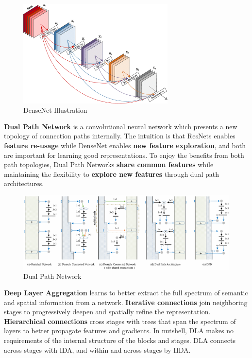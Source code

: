 \documentclass[a4paper, 11pt]{article} %
\begin{document}
\begin{figure}[H]
	\centering
	\includegraphics[width=0.7\textwidth]{./img/densenet.png}
	\caption{DenseNet Illustration}
\end{figure}

\textbf{Dual Path Network} is a convolutional neural network which presents a new topology
of connection paths internally. The intuition is that ResNets enables \textbf{feature re-usage}
while DenseNet enables \textbf{new feature exploration}, and both are important for learning
good representations. To enjoy the benefits from both path topologies, Dual Path Networks
\textbf{share common features} while maintaining the flexibility to \textbf{explore new features}
through dual path architectures.

\begin{figure}[H]
	\centering
	\includegraphics[width=1.0\textwidth]{./img/dpn.png}
	\caption{Dual Path Network}
\end{figure}

\textbf{Deep Layer Aggregation} learns to better extract the full spectrum of semantic and
spatial information from a network. \textbf{Iterative connections} join neighboring stages
to progressively deepen and spatially refine the representation. \textbf{Hierarchical connections}
cross stages with trees that span the spectrum of layers to better propagate features and
gradients. In nutshell, DLA makes no requirements of the internal structure of the blocks
and stages. DLA connects across stages with IDA, and within and across stages by HDA.
\end{document}
